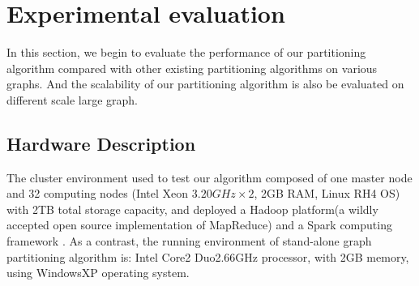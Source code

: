 \documentclass{acm_proc_article-sp}
\begin{document}
\section{Experimental evaluation}
In this section, we begin to evaluate the performance of our partitioning algorithm compared with other existing partitioning algorithms on various graphs. And the scalability of our partitioning algorithm is also be evaluated on different scale large graph.

\subsection {Hardware Description}
The cluster environment used to test our algorithm composed of one master node and 32 computing nodes (Intel Xeon $3.20GHz\times2$, 2GB RAM, Linux RH4 OS) with 2TB total storage capacity, and deployed a Hadoop platform(a wildly accepted open source implementation of MapReduce) and a Spark computing framework \cite{Berkeley:spark}. As a contrast, the running environment of stand-alone graph partitioning algorithm is: Intel Core2 Duo2.66GHz processor, with 2GB memory, using WindowsXP operating system.
\end{document}
